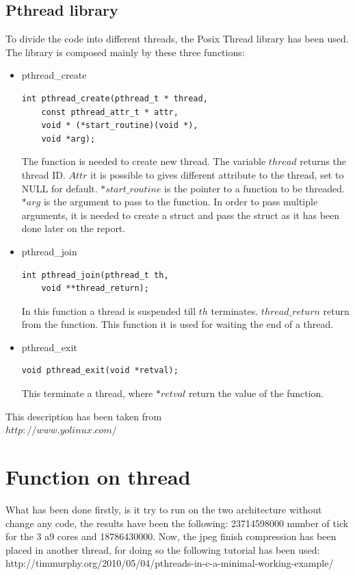 \documentclass[journal]{IEEEtran}
\begin{document}
\subsection{Pthread library}
To divide the code into different threads, the Posix Thread library has been used.
The library is composed mainly by these three functions:

\begin{itemize}
	\item pthread\_create	
\begin{lstlisting}
int pthread_create(pthread_t * thread,
	const pthread_attr_t * attr,
	void * (*start_routine)(void *), 
	void *arg);
\end{lstlisting}

The function is needed to create new thread. 
The variable \(thread\) returns the thread ID. \(Attr\) it is possible to gives different attribute to the thread, set to NULL for default.
\(*start\_routine\) is the pointer to a function to be threaded. 
\(*arg\) is the argument to pass to the function. In order to pass multiple arguments, it is needed to create a struct and pass the struct as it has been done later on the report.\\


	\item pthread\_join
\begin{lstlisting}
int pthread_join(pthread_t th, 
	void **thread_return);
\end{lstlisting}
In this function a thread is suspended till \(th\) terminates. \(thread\_return\) return from the function.
This function it is used for waiting the end of a thread.
	\item pthread\_exit
\begin{lstlisting}
void pthread_exit(void *retval);
\end{lstlisting}
This terminate a thread, where \(*retval\) return the value of the function.
\end{itemize}
This description has been taken from\\
 \(http://www.yolinux.com/\)



\section{Function on thread}

What has been done firstly, is it try to run on the two architecture without change any code, the results have been the following:
23714598000 number of tick for the 3 a9 cores and 18786430000. 
Now, the jpeg finish compression has been placed in another thread, for doing so the following tutorial has been used: http://timmurphy.org/2010/05/04/pthreads-in-c-a-minimal-working-example/
\end{document}
